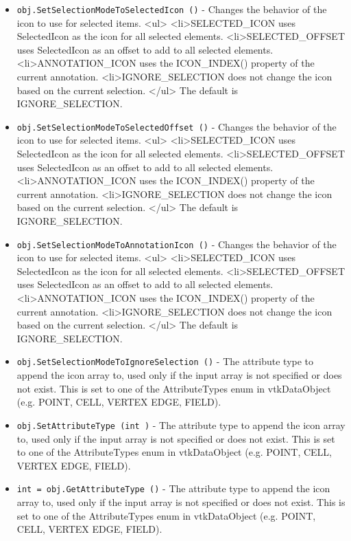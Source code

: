 \begin{itemize}
\item  \verb|obj.SetSelectionModeToSelectedIcon ()| -  Changes the behavior of the icon to use for selected items.
 <ul>
 <li>SELECTED\_ICON uses SelectedIcon as the icon for all selected elements.
 <li>SELECTED\_OFFSET uses SelectedIcon as an offset to add to all selected elements.
 <li>ANNOTATION\_ICON uses the ICON\_INDEX() property of the current annotation.
 <li>IGNORE\_SELECTION does not change the icon based on the current selection.
 </ul>
 The default is IGNORE\_SELECTION.

\item  \verb|obj.SetSelectionModeToSelectedOffset ()| -  Changes the behavior of the icon to use for selected items.
 <ul>
 <li>SELECTED\_ICON uses SelectedIcon as the icon for all selected elements.
 <li>SELECTED\_OFFSET uses SelectedIcon as an offset to add to all selected elements.
 <li>ANNOTATION\_ICON uses the ICON\_INDEX() property of the current annotation.
 <li>IGNORE\_SELECTION does not change the icon based on the current selection.
 </ul>
 The default is IGNORE\_SELECTION.

\item  \verb|obj.SetSelectionModeToAnnotationIcon ()| -  Changes the behavior of the icon to use for selected items.
 <ul>
 <li>SELECTED\_ICON uses SelectedIcon as the icon for all selected elements.
 <li>SELECTED\_OFFSET uses SelectedIcon as an offset to add to all selected elements.
 <li>ANNOTATION\_ICON uses the ICON\_INDEX() property of the current annotation.
 <li>IGNORE\_SELECTION does not change the icon based on the current selection.
 </ul>
 The default is IGNORE\_SELECTION.

\item  \verb|obj.SetSelectionModeToIgnoreSelection ()| -  The attribute type to append the icon array to, used only if the
 input array is not specified or does not exist. This is set to one
 of the AttributeTypes enum in vtkDataObject (e.g. POINT, CELL, VERTEX
 EDGE, FIELD).

\item  \verb|obj.SetAttributeType (int )| -  The attribute type to append the icon array to, used only if the
 input array is not specified or does not exist. This is set to one
 of the AttributeTypes enum in vtkDataObject (e.g. POINT, CELL, VERTEX
 EDGE, FIELD).

\item  \verb|int = obj.GetAttributeType ()| -  The attribute type to append the icon array to, used only if the
 input array is not specified or does not exist. This is set to one
 of the AttributeTypes enum in vtkDataObject (e.g. POINT, CELL, VERTEX
 EDGE, FIELD).

\end{itemize}
